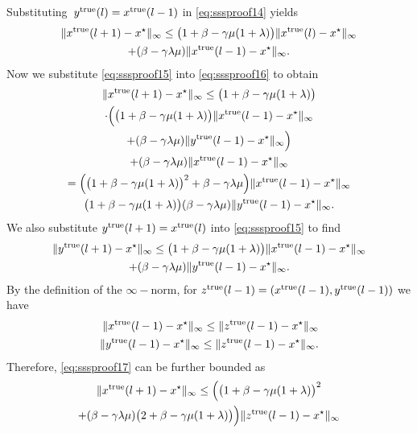 \documentclass[9pt,shortpaper,twoside,web]{ieeecolor}
\newcommand{\tr}{\textnormal{true}}
\begin{document}
    Substituting~$y^\tr(l) = x^\tr(l-1)$ in \eqref{eq:sssproof14} yields
    \begin{multline}\label{eq:sssproof16}
        \Vert x^\tr(l+1)-x^\star\Vert_\infty \leq \big(1+\beta-\gamma\mu(1+\lambda)\big)\Vert x^\tr(l)-x^\star\Vert_\infty
        \\ +(\beta -\gamma\lambda\mu)\Vert x^\tr(l-1)-x^\star\Vert_\infty.
    \end{multline}
    Now we substitute \eqref{eq:sssproof15} into \eqref{eq:sssproof16} to obtain
    \begin{multline}\label{eq:sssproof17}
        \Vert x^\tr(l+1)-x^\star\Vert_\infty 
        \leq \big(1+\beta -\gamma\mu(1+\lambda)\big)\\\cdot\Big(\big(1+\beta-\gamma\mu(1+\lambda)\big)\Vert x^\tr(l-1)-x^\star\Vert_\infty
        \\+(\beta-\gamma\lambda\mu)\Vert y^\tr(l-1)-x^\star\Vert_\infty\Big) \\+ (\beta-\gamma\lambda\mu)\Vert x^\tr(l-1)-x^\star\Vert_\infty
        \\ = \Big(\big(1+\beta-\gamma\mu(1+\lambda)\big)^2+\beta-\gamma\lambda\mu\Big)\Vert x^\tr(l-1)-x^\star\Vert_\infty
        \\ \big(1+\beta-\gamma\mu(1+\lambda)\big)(\beta-\gamma\lambda\mu)\Vert y^\tr(l-1)-x^\star\Vert_\infty.
    \end{multline}
    We also substitute $y^\tr(l+1)=x^\tr(l)$ into \eqref{eq:sssproof15} to find 
    \begin{multline}\label{eq:sssproof18}
        \Vert y^\tr(l+1)-x^\star\Vert_\infty\leq \big(1+\beta-\gamma\mu(1+\lambda)\big)
        \Vert x^\tr(l-1)-x^\star\Vert_\infty
         \\+ (\beta-\gamma\lambda\mu)\Vert y^\tr(l-1)-x^\star\Vert_\infty. 
    \end{multline}
    By the definition of the $\infty-$norm, for $z^\tr(l-1)=(x^\tr(l-1),y^\tr(l-1))$ we have
    \begin{align}
        \Vert x^\tr(l-1)-x^\star\Vert_\infty \leq \Vert z^\tr(l-1)-x^\star\Vert_\infty
        \\ \Vert y^\tr(l-1)-x^\star\Vert_\infty \leq \Vert z^\tr(l-1)-x^\star\Vert_\infty.
    \end{align}
    Therefore, \eqref{eq:sssproof17} can be further bounded as
    \begin{multline}\label{eq:sssproof19}
        \Vert x^\tr(l+1)-x^\star\Vert_\infty \leq \Big(\big(1+\beta-\gamma\mu(1+\lambda)\big)^2 \\+(\beta-\gamma\lambda\mu)\big(2+\beta-\gamma\mu(1+\lambda)\big)\Big)\Vert z^\tr(l-1)-x^\star\Vert_\infty
    \end{multline}
\end{document}
